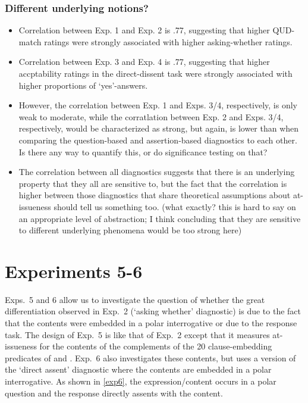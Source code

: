 \documentclass[times,linguex,xcolor]{glossa}
\begin{document}
    \subsubsection{Different underlying notions?}
      \begin{itemize}
        \item Correlation between Exp. 1 and Exp. 2 is .77, suggesting that higher QUD-match ratings were strongly associated with higher asking-whether ratings.

        \item Correlation between Exp. 3 and Exp. 4 is .77, suggesting that higher accptability ratings in the direct-dissent task were strongly associated with higher proportions of `yes'-answers.

        \item However, the correlation between Exp. 1 and Exps. 3/4, respectively, is only weak to moderate, while the corratlation between Exp. 2 and Exps. 3/4, respectively, would be characterized as strong, but again, is lower than when comparing the question-based and assertion-based diagnostics to each other. Is there any way to quantify this, or do significance testing on that?

        \item The correlation between all diagnostics suggests that there is an underlying property that they all are sensitive to, but the fact that the correlation is higher between those diagnostics that share theoretical assumptions about at-issueness should tell us something too. (what exactly? this is hard to say on an appropriate level of abstraction; I think concluding that they are sensitive to different underlying phenomena would be too strong here)

      \end{itemize}

    
        
\section{Experiments 5-6 \label{sec:3_more-experiments}}

  Exps.~5 and 6 allow us to investigate the question of whether the great differentiation observed in Exp.~2 (`asking whether' diagnostic) is due to the fact that the contents were embedded in a polar interrogative or due to the response task. The design of Exp.~5 is like that of Exp.~2 except that it measures at-issueness for the contents of the complements of the 20 clause-embedding predicates of \citealt{tonhauser_how_2018} and \citealt{degen-tonhauser-glossa}. Exp.~6 also investigates these contents, but uses a version of the  `direct assent' diagnostic where the contents are embedded in a polar interrogative. As shown in \ref{exp6}, the expression/content occurs in a polar question and the response directly assents with the content. 
\end{document}
